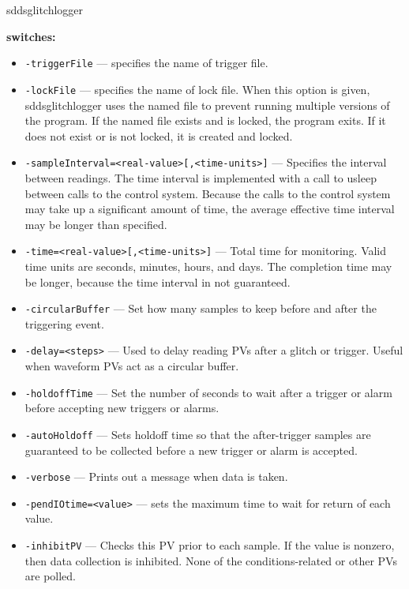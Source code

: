\begin{sddsprog}{sddsglitchlogger}
\item {\bf switches:}
    \begin{itemize}

        \item {\tt -triggerFile} --- specifies the name of trigger file.
        \item {\tt -lockFile} --- specifies the name of lock file. When this option is given,
                sddsglitchlogger uses the named file to prevent running multiple versions of
                the program.  If the named file exists and is locked, the program exits.  
                If it does not exist or is not locked, it is created and locked.
        \item {\tt -sampleInterval=<real-value>[,<time-units>]} --- Specifies the interval between readings.
                The time interval is implemented with a call to usleep between calls to the control system.
                Because the calls to the control system may take up a significant amount of time, the average
                effective time interval may be longer than specified.
        \item {\tt -time=<real-value>[,<time-units>]} --- Total time for monitoring. Valid time units are
                seconds, minutes, hours, and days. The completion time may be longer, because the time
                interval in not guaranteed.
        \item {\tt -circularBuffer} --- Set how many samples to keep before and after the triggering event.
        \item {\tt -delay=<steps>} --- Used to delay reading PVs after a glitch or trigger. Useful when
                waveform PVs act as a circular buffer.
        \item {\tt -holdoffTime} --- Set the number of seconds to wait after a trigger or alarm before
                accepting new triggers or alarms.
        \item {\tt -autoHoldoff} --- Sets holdoff time so that the after-trigger samples are guaranteed
                to be collected before a new trigger or alarm is accepted.
        \item {\tt -verbose} --- Prints out a message when data is taken.
        \item {\tt -pendIOtime=<value>} --- sets the maximum time to wait for return of each value.
        \item {\tt -inhibitPV} --- Checks this PV prior to each sample.  If the value is nonzero,
                then data collection is inhibited.  None of the conditions-related or other PVs are polled.

\end{itemize}
\end{sddsprog}
